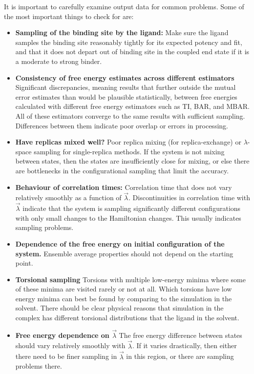 \documentclass[9pt,bestpractices,pubversion]{livecoms}
\begin{document}
It is important to carefully examine output data for common problems. Some of the most important things to check for are:
\begin{itemize}
\item \textbf{Sampling of the binding site by the ligand:} Make sure the ligand samples the binding site reasonably tightly for its expected potency and fit, and that it does not depart out of binding site in the coupled end state if it is a moderate to strong binder. 
\item \textbf{Consistency of free energy estimates across different estimators} Significant discrepancies, meaning results that further outside the mutual error estimates than would be plausible statistically, between free energies calculated with different free energy estimators such as TI, BAR, and MBAR. All of these estimators converge to the same results with sufficient sampling. Differences between them indicate poor overlap or errors in processing.
\item \textbf{Have replicas mixed well?} Poor replica mixing (for replica-exchange) or $\lambda$-space sampling for single-replica methods. If the system is not mixing between states, then the states are insufficiently close for mixing, or else there are bottlenecks in the configurational sampling that limit the accuracy.
\item \textbf{Behaviour of correlation times:} Correlation time that does not vary relatively smoothly as a function of $\vec{\lambda}$. Discontinuities in correlation time with $\vec{\lambda}$ indicate that the system is sampling significantly different configurations with only small changes to the Hamiltonian changes. This usually indicates sampling problems.
\item \textbf{Dependence of the free energy on initial configuration of the system.} Ensemble average properties should not depend on the starting point.
\item \textbf{Torsional sampling} Torsions with multiple low-energy minima where some of these minima are visited rarely or not at all. Which torsions have low energy minima can best be found by comparing to the simulation in the solvent. There should be clear physical reasons that simulation in the complex has different torsional distributions that the ligand in the solvent. 
\item \textbf{Free energy dependence on $\vec{\lambda}$} The free energy difference between states should vary relatively smoothly with $\vec{\lambda}$. If it varies drastically, then either there need to be finer sampling in $\vec{\lambda}$ in this region, or there are sampling problems there.

\end{itemize}
\end{document}
